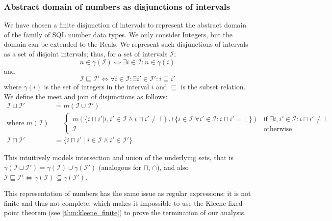 \subsubsection{Abstract domain of numbers as disjunctions of intervals}\label{subsubsec:abstract_domains_numbers}
We have chosen a finite disjunction of intervals to represent the abstract domain of the family of SQL number data types.
We only consider Integers, but the domain can be extended to the Reals.
We represent such disjunctions of intervals as a set of disjoint intervals; thus, for a set of intervals $\mathscr{I}$:
\begin{equation}
    n \in \gamma(\mathscr{I}) \iff \exists i \in \mathscr{I} : n \in \gamma(i)
\end{equation}
and
\begin{equation}
    \mathscr{I} \sqsubseteq \mathscr{I}' \iff \forall i \in \mathscr{I} : \exists i' \in \mathscr{I}' : i \sqsubseteq i'
\end{equation}
where $\gamma(i)$ is the set of integers in the interval $i$ and $\sqsubseteq$ is the subset relation.
We define the meet and join of disjunctions as follows:
\begin{align}
    \mathscr{I} \sqcup \mathscr{I}' &= m(\mathscr{I} \cup \mathscr{I}') \\
    \text{where } m(\mathscr{I}) &= \begin{cases}
        m(\{ i \sqcup i' | i, i' \in \mathscr{I} \land i \sqcap i' \neq \bot \} \cup \{ i \in \mathscr{I} | \forall i' \in \mathscr{I} : i \sqcap i' = \bot \}) & \text{if } \exists i, i' \in \mathscr{I}: i \sqcap i' \neq \bot \\
        \mathscr{I} & \text{otherwise}
    \end{cases} \\
    \mathscr{I} \sqcap \mathscr{I}' &= \{i \sqcap i' \mid i \in \mathscr{I} \land i' \in \mathscr{I}'\}
\end{align}

This intuitively models intersection and union of the underlying sets, that is $\gamma(\mathscr{I} \sqcup \mathscr{I}') = \gamma(\mathscr{I}) \cup \gamma(\mathscr{I}')$ (analogous for $\sqcap$, $\cap$), and also $\mathscr{I} \sqsubseteq \mathscr{I}' \iff \gamma(\mathscr{I}) \subseteq \gamma(\mathscr{I}')$.

This representation of numbers has the same issue as regular expressions: it is not finite and thus not complete, which makes it impossible to use the Kleene fixed-point theorem (see \autoref{thm:kleene_finite}) to prove the termination of our analysis.
